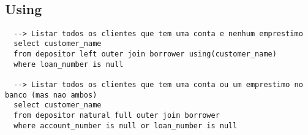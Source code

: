 \documentclass{article}
\begin{document}
\

\subsection{Using}
\begin{lstlisting}
  --> Listar todos os clientes que tem uma conta e nenhum emprestimo
  select customer_name
  from depositor left outer join borrower using(customer_name)
  where loan_number is null  

  --> Listar todos os clientes que tem uma conta ou um emprestimo no banco (mas nao ambos)
  select customer_name
  from depositor natural full outer join borrower
  where account_number is null or loan_number is null
\end{lstlisting}
\end{document}

